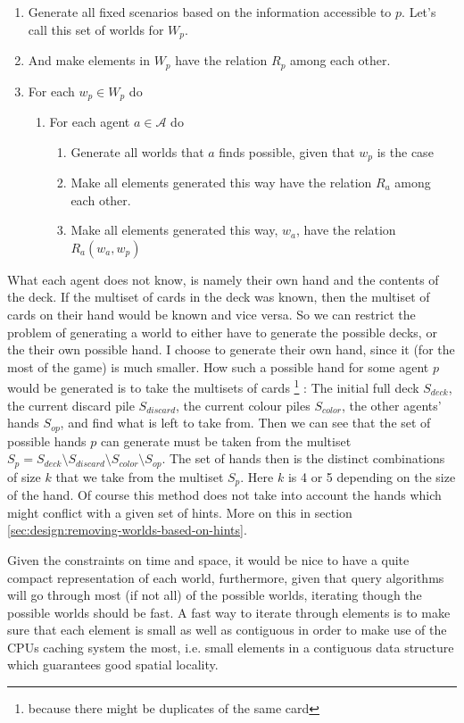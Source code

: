 \begin{enumerate}
	\item Generate all fixed scenarios based on the information accessible to $p$. Let's call this set of worlds for $W_p$. 
	\item And make elements in $W_p$ have the relation $R_p$ among each other.
	\item For each $w_p \in W_p$ do
		\begin{enumerate}
			\item For each agent $a \in \mathcal{A}$ do
				\begin{enumerate}
				\item Generate all worlds that $a$ finds possible, given that $w_p$ is the case
				\item Make all elements generated this way have the relation $R_a$ among each other.
				\item Make all elements generated this way, $w_a$, have the relation $R_a(w_a,w_p)$
				\end{enumerate}
		\end{enumerate}
\end{enumerate}

What each agent does not know, is namely their own hand and the contents of the deck. 
If the multiset of cards in the deck was known, then the multiset of cards on their hand would be known and vice versa. 
So we can restrict the problem of generating a world to either have to generate the possible decks, or the their own possible hand. 
I choose to generate their own hand, since it (for the most of the game) is much smaller.
How such a possible hand for some agent $p$ would be generated is to take the multisets of cards
\footnote{because there might be duplicates of the same card}
: The initial full deck $S_{deck}$, the current discard pile $S_{discard}$, the current colour piles $S_{color}$, the other agents' hands $S_{op}$, and find what is left to take from. 
 Then we can see that the set of possible hands $p$ can generate must be taken from the multiset $S_p = S_{deck} \setminus S_{discard} \setminus S_{color} \setminus S_{op}$. 
 The set of hands then is the distinct combinations of size $k$ that we take from the multiset $S_p$.
Here $k$ is 4 or 5 depending on the size of the hand.
Of course this method does not take into account the hands which might conflict with a given set of hints. 
More on this in section \ref{sec:design:removing-worlds-based-on-hints}.


Given the constraints on time and space, it would be nice to have a quite compact representation of each world, furthermore, given that query algorithms will go through most (if not all) of the possible worlds, iterating though the possible worlds should be fast. 
A fast way to iterate through elements is to make sure that each element is small as well as contiguous in order to make use of the CPUs caching system the most, i.e. small elements in a contiguous data structure which guarantees good spatial locality.



